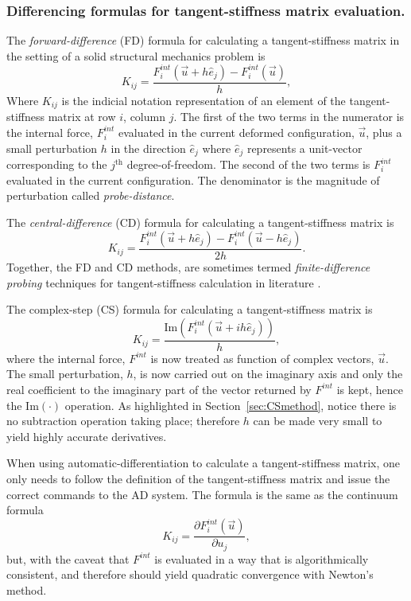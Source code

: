 \documentclass[preprint,12pt]{elsarticle}
\begin{document}
\subsubsection{Differencing formulas for tangent-stiffness matrix evaluation.}

The \emph{forward-difference} (FD) formula for calculating a tangent-stiffness matrix in the setting of a solid structural mechanics problem is
%
\begin{equation} 
  K_{ij} = \frac{F_i^{int}(\vec{u} + h \hat{e}_j) - F_i^{int}(\vec{u})}{h},
\end{equation}
%
Where $K_{ij}$ is the indicial notation representation of an element of the tangent-stiffness matrix at row $i$, column $j$. The first of the two terms in the numerator is the internal force, $F_i^{int}$ evaluated in the current deformed configuration, $\vec{u}$,  plus a small perturbation $h$ in the direction $\hat{e}_j$ where $\hat{e}_j$ represents a unit-vector corresponding to the $j^{\mbox{th}}$ degree-of-freedom. The second of the two terms is $F_i^{int}$ evaluated in the current configuration. The denominator is the magnitude of perturbation called \emph{probe-distance}.

The \emph{central-difference} (CD) formula for calculating a tangent-stiffness matrix is
%
\begin{equation} 
  K_{ij} = \frac{F_i^{int}(\vec{u} + h \hat{e}_j) - F_i^{int}(\vec{u} - h \hat{e}_j)}{2 h}.
\end{equation}
%
Together, the FD and CD methods, are sometimes termed \emph{finite-difference probing} techniques for tangent-stiffness calculation in literature \cite{ref-Adaggio}.

The complex-step (CS) formula for calculating a tangent-stiffness matrix is
%
\begin{equation} 
  K_{ij} = \frac{\mbox{Im}(F_i^{int}(\vec{u} + i h \hat{e}_j))}{h},
\end{equation}
%
where the internal force, $F^{int}$ is now treated as function of complex vectors,  $\vec{u}$. The small perturbation, $h$, is now carried out on the imaginary axis and only the real coefficient to the imaginary part of the vector returned by $F^{int}$ is kept, hence the $\mbox{Im}(\cdot)$ operation. As highlighted in Section~\ref{sec:CSmethod}, notice there is no subtraction operation taking place; therefore $h$ can be made very small to yield highly accurate derivatives.

When using automatic-differentiation to calculate a tangent-stiffness matrix, one only needs to follow the definition of the tangent-stiffness matrix and issue the correct commands to the AD system. The formula is the same as the continuum formula
%
\begin{equation} 
  K_{ij} = \frac{\partial F_i^{int}(\vec{u})}{\partial u_j},
\end{equation}
%
but, with the caveat that $F^{int}$ is evaluated in a way that is algorithmically consistent, and therefore should yield quadratic convergence with Newton's method.
\end{document}
